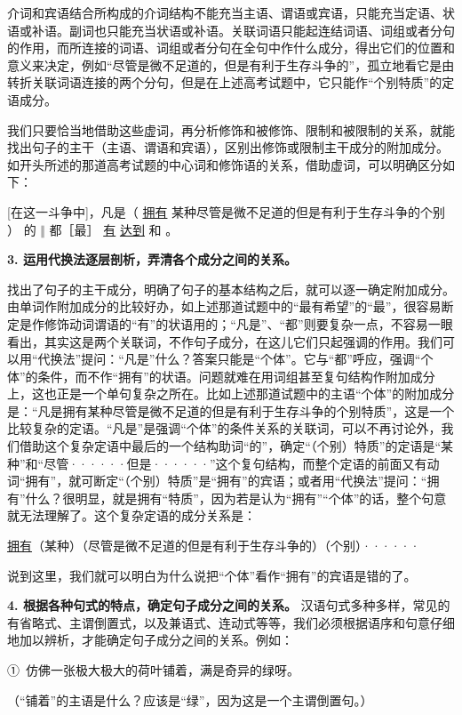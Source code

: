 介词和宾语结合所构成的介词结构不能充当主语、谓语或宾语，只能充当定语、状语或补语。副词也只能充当状语或补语。关联词语只能起连结词语、词组或者分句的作用，而所连接的词语、词组或者分句在全句中作什么成分，得出它们的位置和意义来决定，例如“尽管是微不足道的，但是有利于生存斗争的”，孤立地看它是由转折关联词语连接的两个分句，但是在上述高考试题中，它只能作“个别特质”的定语成分。

我们只要恰当地借助这些虚词，再分析修饰和被修饰、限制和被限制的关系，就能找出句子的主干（主语、谓语和宾语），区别出修饰或限制主干成分的附加成分。如开头所述的那道高考试题的中心词和修饰语的关系，借助虚词，可以明确区分如下：

[在这一斗争中]，凡是（
\uline{拥有}
某种尽管是微不足道的但是有利于生存斗争的个别
）
的
$\Vert$
都［最］
\uline{有}
\uline{达到}
和
。

\textbf{3. 运用代换法逐层剖析，弄清各个成分之间的关系。}

找出了句子的主干成分，明确了句子的基本结构之后，就可以逐一确定附加成分。由单词作附加成分的比较好办，如上述那道试题中的“最有希望”的“最”，很容易断定是作修饰动词谓语的“有”的状语用的；“凡是”、“都”则要复杂一点，不容易一眼看出，其实这是两个关联词，不作句子成分，在这儿它们只起强调的作用。我们可以用“代换法”提问：“凡是”什么？答案只能是“个体”。它与“都”呼应，强调“个体”的条件，而不作“拥有”的状语。问题就难在用词组甚至复句结构作附加成分上，这也正是一个单句复杂之所在。比如上述那道试题中的主语“个体”的附加成分是：“凡是拥有某种尽管是微不足道的但是有利于生存斗争的个别特质”，这是一个比较复杂的定语。“凡是”是强调“个体”的条件关系的关联词，可以不再讨论外，我们借助这个复杂定语中最后的一个结构助词“的”，确定“（个别）特质”的定语是“某种”和“尽管······但是······”这个复句结构，而整个定语的前面又有动词“拥有”，就可断定“（个别）特质”是“拥有”的宾语；或者用“代换法”提问：“拥有”什么？很明显，就是拥有“特质”，因为若是认为“拥有”“个体”的话，整个句意就无法理解了。这个复杂定语的成分关系是：

\uline{拥有}（某种）（尽管是微不足道的但是有利于生存斗争的）（个别）······

说到这里，我们就可以明白为什么说把“个体”看作“拥有”的宾语是错的了。

\textbf{4. 根据各种句式的特点，确定句子成分之间的关系。}
汉语句式多种多样，常见的有省略式、主谓倒置式，以及兼语式、连动式等等，我们必须根据语序和句意仔细地加以辨析，才能确定句子成分之间的关系。例如：

①\ 仿佛一张极大极大的荷叶铺着，满是奇异的绿呀。

（“铺着”的主语是什么？应该是“绿”，因为这是一个主谓倒置句。）

